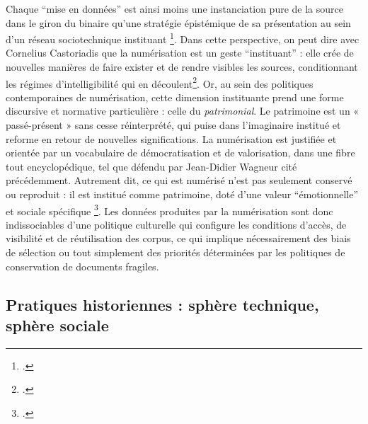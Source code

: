 Chaque \enquote{mise en données} est ainsi moins une instanciation pure de la source dans le giron du binaire qu'une stratégie épistémique de sa présentation au sein d’un réseau sociotechnique instituant \footcite[][]{renon}. Dans cette perspective, on peut dire avec Cornelius Castoriadis que la numérisation est un geste \enquote{instituant} : elle crée de nouvelles manières de faire exister et de rendre visibles les sources, conditionnant les régimes d’intelligibilité qui en découlent\footcite[][]{rautenberg}. Or, au sein des politiques contemporaines de numérisation, cette dimension instituante prend une forme discursive et normative particulière : celle du \emph{patrimonial}. Le patrimoine est un « passé-présent » sans cesse réinterprété, qui puise dans l’imaginaire institué et reforme en retour de nouvelles significations. La numérisation est justifiée et orientée par un vocabulaire de démocratisation et de valorisation, dans une fibre tout encyclopédique, tel que défendu par Jean-Didier Wagneur cité précédemment. Autrement dit, ce qui est numérisé n’est pas seulement conservé ou reproduit : il est institué comme patrimoine, doté d’une valeur \enquote{émotionnelle} et sociale spécifique \footcite[][]{bermesbook}. Les données produites par la numérisation sont donc indissociables d’une politique culturelle qui configure les conditions d’accès, de visibilité et de réutilisation des corpus, ce qui implique nécessairement des biais de sélection ou tout simplement des priorités déterminées par les politiques de conservation de documents fragiles.

\subsection{Pratiques historiennes : sphère technique, sphère sociale}

